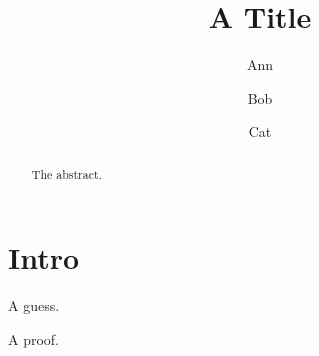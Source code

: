 \documentclass[namedreferences]{kluwer}
\begin{document}
\begin{article}
\begin{opening}
\title{A Title}
\author{Ann }
\author{Bob }
\author{Cat }
\begin{abstract}
The abstract.
\end{abstract}
\end{opening}
\section{Intro}
\begin{guess}A guess.\end{guess}
\begin{pf}A proof.\end{pf}
\end{article}
\end{document}

